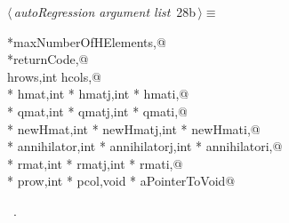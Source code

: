 \documentclass{article}
\begin{document}
\label{sec:autoRegression}

\begin{flushleft} \small
\begin{minipage}{\linewidth}\label{scrap31}\raggedright\small
{} $\langle\,${\itshape autoRegression argument list}\nobreak\ {\footnotesize {28b}}$\,\rangle\equiv$
\vspace{-1ex}
\begin{list}{}{} \item
\mbox{}\verb@int *maxNumberOfHElements,@\\
\mbox{}\verb@int *returnCode,@\\
\mbox{}\verb@int hrows,int hcols,@\\
\mbox{}\verb@double * hmat,int * hmatj,int * hmati,@\\
\mbox{}\verb@double * qmat,int * qmatj,int * qmati,@\\
\mbox{}\verb@double * newHmat,int * newHmatj,int * newHmati,@\\
\mbox{}\verb@double * annihilator,int * annihilatorj,int * annihilatori,@\\
\mbox{}\verb@double * rmat,int * rmatj,int * rmati,@\\
\mbox{}\verb@int * prow,int * pcol,void * aPointerToVoid@\\
\mbox{}\verb@@{\NWsep}
\end{list}
\vspace{-1.5ex}
\footnotesize
\begin{list}{}{\setlength{\itemsep}{-\parsep}\setlength{\itemindent}{-\leftmargin}}
\item \NWtxtMacroRefIn\ .

\end{list}
\end{minipage}
\end{flushleft}
\end{document}

